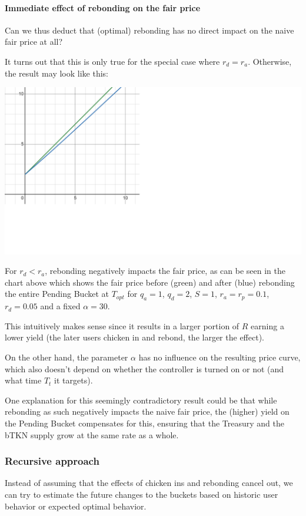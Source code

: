 \documentclass{article}
\begin{document}
\paragraph{Immediate effect of rebonding on the fair price}
Can we thus deduct that (optimal) rebonding has no direct impact on the naive fair price at all?

It turns out that this is only true for the special case where $r_d = r_a$. Otherwise, the result may look like this:

\includegraphics[width=\linewidth]{./ChickenBonds_Whitepaper_rebonding.png}

For $r_d < r_a$, rebonding negatively impacts the fair price, as can be seen in the chart above which shows the fair price before (green) and after (blue) rebonding the entire Pending Bucket at $T_{opt}$ for $q_a=1$, $q_d=2$, $S=1$, $r_a=r_p=0.1$, $r_d=0.05$ and a fixed $\alpha=30$. 

This intuitively makes sense since it results in a larger portion of $R$ earning a lower yield (the later users chicken in and rebond, the larger the effect). 

On the other hand, the parameter $\alpha$ has no influence on the resulting price curve, which also doesn't depend on whether the controller is turned on or not (and what time $T_t$ it targets).

One explanation for this seemingly contradictory result could be that while rebonding as such negatively impacts the naive fair price, the (higher) yield on the Pending Bucket compensates for this, ensuring that the Treasury and the bTKN supply grow at the same rate as a whole.

\subsubsection{Recursive approach}
Instead of assuming that the effects of chicken ins and rebonding cancel out, we can try to estimate the future changes to the buckets based on historic user behavior or expected optimal behavior.
\end{document}
